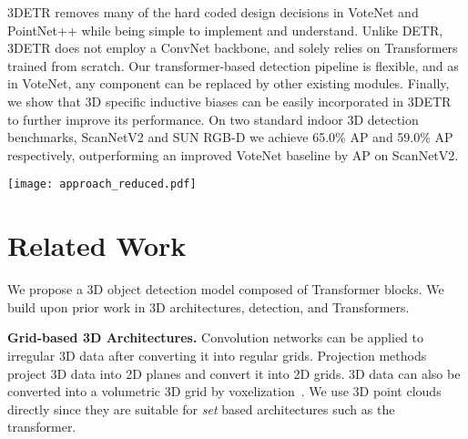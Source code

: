 \documentclass[10pt,twocolumn,letterpaper]{article}
\newcommand{\OURS}{3DETR\xspace}
\newcommand{\sunrgbd}{SUN RGB-D\xspace}
\newcommand{\scannet}{ScanNetV2\xspace}
\begin{document}
 \OURS removes many of the hard coded design decisions in VoteNet and PointNet++ while being simple to implement and understand.
Unlike DETR, \OURS does not employ a ConvNet backbone, and solely relies on Transformers trained from scratch.
Our transformer-based detection pipeline is flexible, and
as in VoteNet, any component can be replaced by other existing modules.
Finally, we show that 3D specific inductive biases can be easily incorporated in \OURS to further improve its performance.
On two standard indoor 3D detection benchmarks, \scannet and \sunrgbd we achieve 65.0\% AP and 59.0\% AP respectively, outperforming an improved VoteNet baseline by  AP on \scannet.




\begin{figure*}[!t]
\centering
\texttt{[image: approach\_reduced.pdf]}

\vspace{-0.1in}
\caption{\textbf{Approach.}
\emph{(Left)} \OURS is an end-to-end trainable Transformer that takes a set of 3D points (point cloud) as input and outputs a set of 3D bounding boxes.
The Transformer encoder produces a set of per-point features using multiple layers of self-attention.
The point features and a set of `query' embeddings are input to the Transformer decoder that produces a set of boxes.
We match the predicted boxes to the ground truth and optimize a set loss.
Our model does not use color information (used for visualization only).
\emph{(Right)}
We randomly sample a set of `query' points that are embedded and then converted into bounding box predictions by the decoder.
}
\label{fig:approach}
\end{figure*}
\vspace{-0.1in}
\section{Related Work}
\label{sec:related}
\vspace{-0.1in}


We propose a 3D object detection model composed of Transformer blocks.
We build upon prior work in 3D architectures, detection, and Transformers.

\vspace{0.02in}
\par \noindent \textbf{Grid-based 3D Architectures.}
Convolution networks can be applied to irregular 3D data after converting it into regular grids.
Projection methods~\cite{su2015multi,su2018splatnet,boulch2017unstructured,lawin2017deep,kanezaki2018rotationnet,lang2019pointpillars,tatarchenko2018tangent} project 3D data into 2D planes and convert it into 2D grids.
3D data can also be converted into a volumetric 3D grid by voxelization~\cite{tchapmi2017segcloud,riegler2017octnet,graham2015sparse,adams2010fast,hermosilla2018monte,li2018pointcnn,maturana2015voxnet,song2017semantic}.
We use 3D point clouds directly since they are suitable for \emph{set} based architectures such as the transformer.
\end{document}
